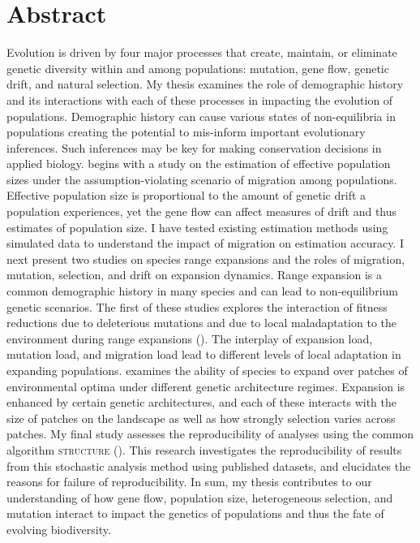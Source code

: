 \chapter*{Abstract}

Evolution is driven by four major processes that create, maintain, or eliminate genetic diversity within and among populations: mutation, gene flow, genetic drift, and natural selection. My thesis examines the role of demographic history and its interactions with each of these processes in impacting the evolution of populations. Demographic history can cause various states of non-equilibria in populations creating the potential to mis-inform important evolutionary inferences. Such inferences may be key for making conservation decisions in applied biology.  begins with a study on the estimation of effective population sizes under the assumption-violating scenario of migration among populations. Effective population size is proportional to the amount of genetic drift a population experiences, yet the gene flow can affect measures of drift and thus estimates of population size. I have tested existing estimation methods using simulated data to understand the impact of migration on estimation accuracy. I next present two studies on species range expansions and the roles of migration, mutation, selection, and drift on expansion dynamics. Range expansion is a common demographic history in many species and can lead to non-equilibrium genetic scenarios. The first of these studies explores the interaction of fitness reductions due to deleterious mutations and due to local maladaptation to the environment during range expansions (). The interplay of expansion load, mutation load, and migration load lead to different levels of local adaptation in expanding populations.  examines the ability of species to expand over patches of environmental optima under different genetic architecture regimes. Expansion is enhanced by certain genetic architectures, and each of these interacts with the size of patches on the landscape as well as how strongly selection varies across patches. My final study assesses the reproducibility of analyses using the common algorithm \textsc{structure} (). This research investigates the reproducibility of results from this stochastic analysis method using published datasets, and elucidates the reasons for failure of reproducibility. In sum, my thesis contributes to our understanding of how gene flow, population size, heterogeneous selection, and mutation interact to impact the genetics of populations and thus the fate of evolving biodiversity.

